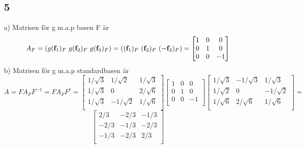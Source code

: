 \documentclass{article}
\begin{document}
\subsection*{5}
a) Matrisen för g m.a.p basen F är
$$
A_F = ({g({\bf f}_1})_F \ {g({\bf f}_2})_F \ {g({\bf f}_3})_F) = 
(({\bf f}_1)_F \ {({\bf f}_2})_F \ {(-{\bf f}_3})_F ) = 
\begin{bmatrix}
    1   &   0   &   0   \\
    0   &   1   &   0   \\
    0   &   0   &  -1   \\
\end{bmatrix}
$$
b) Matrisen för g m.a.p standardbasen är
$$
A = F A_F F^{-1} = F A_F F^t = 
\begin{bmatrix}
    1/\sqrt{3} & 1/\sqrt{2}  & 1/\sqrt{3} \\
    1/\sqrt{3} &      0      & 2/\sqrt{6} \\
    1/\sqrt{3} & -1/\sqrt{2} & 1/\sqrt{6} \\
\end{bmatrix}
\begin{bmatrix}
    1 & 0 & 0 \\
    0 & 1 & 0 \\
    0 & 0 & -1 \\ 
\end{bmatrix}
\begin{bmatrix}
    1/\sqrt{3} & -1/\sqrt{3} & 1/\sqrt{3} \\
    1/\sqrt{2} &     0       & -1/\sqrt{2} \\
    1/\sqrt{6} & 2/\sqrt{6} & 1/\sqrt{6} \\
\end{bmatrix}
=
$$
$$
\begin{bmatrix}
    2/3 & -2/3 & -1/3 \\   
    -2/3 & -1/3 & -2/3 \\   
    -1/3 & -2/3 & 2/3 \\
\end{bmatrix}
$$
\end{document}

